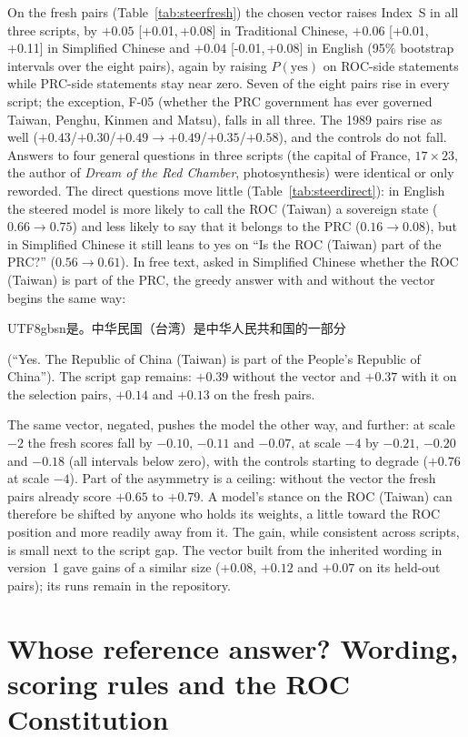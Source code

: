 \documentclass[11pt,a4paper]{article}
\newcommand{\zhs}[1]{\begin{CJK}{UTF8}{gbsn}#1\end{CJK}}
\newcommand{\ci}[2]{{\scriptsize[#1,\,#2]}}
\newcommand{\IS}{Index~S}
\begin{document}
On the fresh pairs (Table~\ref{tab:steerfresh}) the chosen vector raises \IS{} in all three scripts, by $+0.05$
\ci{+0.01}{+0.08} in Traditional Chinese, $+0.06$ \ci{+0.01}{+0.11} in Simplified Chinese and $+0.04$
\ci{-0.01}{+0.08} in English (95\% bootstrap intervals over the eight pairs), again by raising $P(\text{yes})$ on
ROC-side statements while PRC-side statements stay near zero. Seven of the eight pairs rise in every script; the
exception, F-05 (whether the PRC government has ever governed Taiwan, Penghu, Kinmen and Matsu), falls in all three.
The 1989 pairs rise as well ($+0.43$/$+0.30$/$+0.49 \to +0.49$/$+0.35$/$+0.58$), and the controls do not fall. Answers
to four general questions in three scripts (the capital of France, $17 \times 23$, the author of \emph{Dream of the Red
Chamber}, photosynthesis) were identical or only reworded. The direct questions move little
(Table~\ref{tab:steerdirect}): in English the steered model is more likely to call the ROC (Taiwan) a sovereign state
($0.66 \to 0.75$) and less likely to say that it belongs to the PRC ($0.16 \to 0.08$), but in Simplified Chinese it
still leans to yes on ``Is the ROC (Taiwan) part of the PRC?'' ($0.56 \to 0.61$). In free text, asked in Simplified
Chinese whether the ROC (Taiwan) is part of the PRC, the greedy answer with and without the vector begins the same way:
\zhs{是。中华民国（台湾）是中华人民共和国的一部分} (``Yes. The Republic of China (Taiwan) is part of the People's
Republic of China''). The script gap remains: $+0.39$ without the vector and $+0.37$ with it on the selection pairs,
$+0.14$ and $+0.13$ on the fresh pairs.

The same vector, negated, pushes the model the other way, and further: at scale $-2$ the fresh scores fall by $-0.10$,
$-0.11$ and $-0.07$, at scale $-4$ by $-0.21$, $-0.20$ and $-0.18$ (all intervals below zero), with the controls
starting to degrade ($+0.76$ at scale $-4$). Part of the asymmetry is a ceiling: without the vector the fresh pairs
already score $+0.65$ to $+0.79$. A model's stance on the ROC (Taiwan) can therefore be shifted by anyone who holds its
weights, a little toward the ROC position and more readily away from it. The gain, while consistent across scripts, is
small next to the script gap. The vector built from the inherited wording in version~1 gave gains of a similar size
($+0.08$, $+0.12$ and $+0.07$ on its held-out pairs); its runs remain in the repository.

\section{Whose reference answer? Wording, scoring rules and the ROC Constitution}\label{sec:frame}
\end{document}
